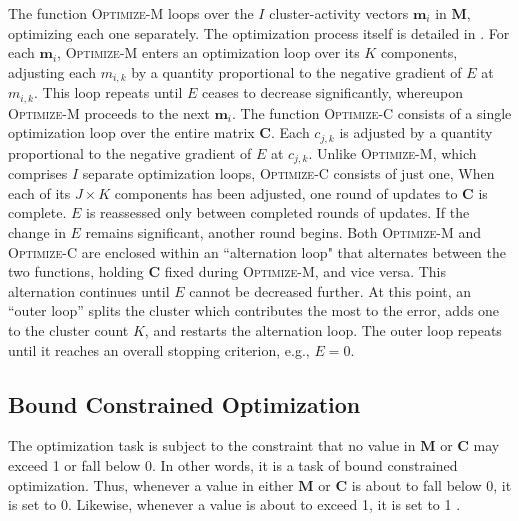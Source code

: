 The function \textsc{Optimize-M} loops over the $I$ cluster-activity vectors $\mathbf{m}_i$ in
$\mathbf{M}$, optimizing each one separately.  The optimization process itself is detailed in \cite{cheng-and-li:2012}.
For each $\mathbf{m}_i$, \textsc{Optimize-M} enters an optimization 
loop over its $K$ components, adjusting each 
$m_{i,k}$ by a
quantity proportional to the negative gradient of $E$ at $m_{i,k}$. 
This loop repeats until $E$
ceases to decrease significantly,
whereupon \textsc{Optimize-M} proceeds to the next $\mathbf{m}_i$.  
The function \textsc{Optimize-C} consists of a single optimization loop over the 
entire matrix
$\mathbf{C}$. Each $c_{j,k}$ is adjusted by a quantity
proportional to the negative gradient of $E$ at $c_{j,k}$.
Unlike \textsc{Optimize-M}, which comprises $I$ separate optimization
loops, \textsc{Optimize-C} consists of just one, 
When each of its $J \times K$
components has been adjusted, one round of updates to $\mathbf{C}$ is
complete.  $E$ is reassessed only between completed rounds of
updates. If the change in $E$ remains significant, another round begins.  
Both \textsc{Optimize-M} and \textsc{Optimize-C} are enclosed within 
an ``alternation loop" 
that alternates between the two functions, holding $\mathbf{C}$ fixed
during \textsc{Optimize-M}, and vice versa.
This alternation continues until $E$ cannot be decreased further. At
this point, an ``outer loop''
splits the cluster which contributes the most to the error, adds one
to the cluster count $K$, and restarts the alternation loop. The outer loop
repeats until it reaches an overall stopping criterion, e.g., $E = 0$.
 \subsection{Bound Constrained Optimization}
The optimization task is subject to the constraint %
that no value in $\mathbf{M}$ or $\mathbf{C}$ may exceed 1 or fall below 0. In other words,
it is a task of bound constrained optimization. Thus, whenever a value in either $\mathbf{M}$ or $\mathbf{C}$ is about
to fall below 0, it is set to 0. Likewise, whenever a value is about to exceed 1, it is set to 1
\citep{ni:yuan:1997}.
  
